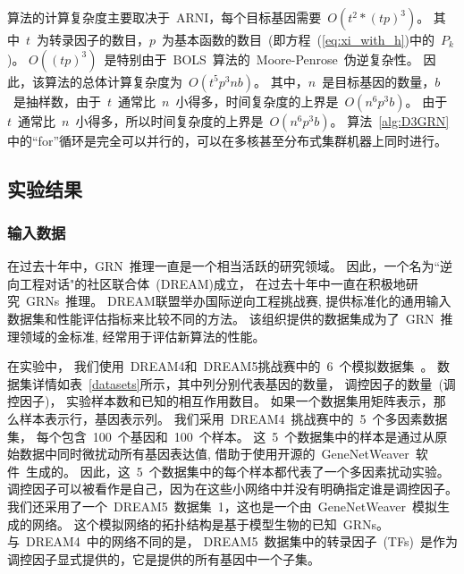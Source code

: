 算法的计算复杂度主要取决于~ARNI，每个目标基因需要~$O(t^2*(tp)^3)$。
其中~$t$~为转录因子的数目，$p$~为基本函数的数目~(即方程~(\ref{eq:xi_with_h})中的~$P_k$)。
$O((tp)^3)$~是特别由于~BOLS~算法的~Moore-Penrose~伪逆复杂性。
因此，该算法的总体计算复杂度为~$O(t^5p^3nb)$。
其中，$n$~是目标基因的数量，$b$~是抽样数，由于~$t$~通常比~$n$~小得多，时间复杂度的上界是~$O(n^6p^3b)$。
由于~$t$~通常比~$n$~小得多，所以时间复杂度的上界是~$O(n^6p^3b)$。
算法~\ref{alg:D3GRN}中的``for''循环是完全可以并行的，可以在多核甚至分布式集群机器上同时进行。


\subsection{实验结果}
\subsubsection{输入数据}
在过去十年中，GRN~推理一直是一个相当活跃的研究领域。
因此，一个名为``逆向工程对话"的社区联合体~(DREAM)\cite{stolovitzky2007dialogue}成立，
在过去十年中一直在积极地研究~GRNs~推理。
DREAM联盟举办国际逆向工程挑战赛, 提供标准化的通用输入数据集和性能评估指标来比较不同的方法。
该组织提供的数据集成为了~GRN~推理领域的金标准, 经常用于评估新算法的性能。

在实验中，
我们使用~DREAM4和~DREAM5挑战赛中的~6~个模拟数据集~\cite{marbach2012wisdom}。
数据集详情如表~\ref{datasets}所示，其中列分别代表基因的数量，
调控因子的数量~(调控因子)，
实验样本数和已知的相互作用数目。
如果一个数据集用矩阵表示，那么样本表示行，基因表示列。
我们采用~DREAM4~挑战赛中的~5~个多因素数据集，
每个包含~100~个基因和~100~个样本。
这~5~个数据集中的样本是通过从原始数据中同时微扰动所有基因表达值, 借助于使用开源的~GeneNetWeaver~软件~\cite{marbach2009generating}生成的。
因此，这~5~个数据集中的每个样本都代表了一个多因素扰动实验。
调控因子可以被看作是自己，因为在这些小网络中并没有明确指定谁是调控因子。
我们还采用了一个~DREAM5~数据集~1，这也是一个由~GeneNetWeaver~模拟生成的网络。
这个模拟网络的拓扑结构是基于模型生物的已知~GRNs。
与~DREAM4~中的网络不同的是，
DREAM5~数据集中的转录因子~(TFs)~是作为调控因子显式提供的，它是提供的所有基因中一个子集。


